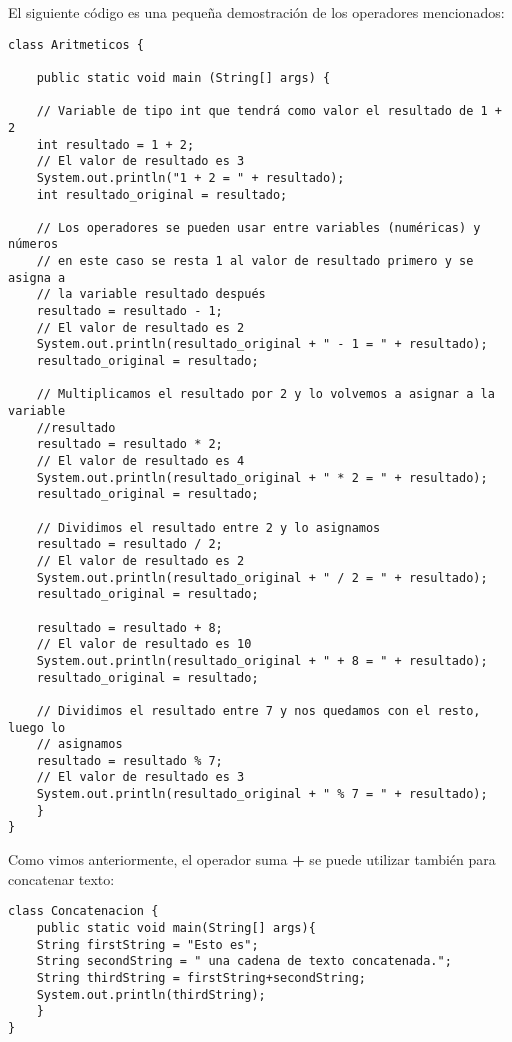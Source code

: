 \documentclass[11pt]{article}
\begin{document}
El siguiente código es una pequeña demostración de los operadores mencionados:
\begin{verbatim}
class Aritmeticos {

    public static void main (String[] args) {

	// Variable de tipo int que tendrá como valor el resultado de 1 + 2
	int resultado = 1 + 2;
	// El valor de resultado es 3
	System.out.println("1 + 2 = " + resultado);
	int resultado_original = resultado;

	// Los operadores se pueden usar entre variables (numéricas) y números
	// en este caso se resta 1 al valor de resultado primero y se asigna a
	// la variable resultado después
	resultado = resultado - 1;
	// El valor de resultado es 2
	System.out.println(resultado_original + " - 1 = " + resultado);
	resultado_original = resultado;

	// Multiplicamos el resultado por 2 y lo volvemos a asignar a la variable
	//resultado
	resultado = resultado * 2;
	// El valor de resultado es 4
	System.out.println(resultado_original + " * 2 = " + resultado);
	resultado_original = resultado;

	// Dividimos el resultado entre 2 y lo asignamos
	resultado = resultado / 2;
	// El valor de resultado es 2
	System.out.println(resultado_original + " / 2 = " + resultado);
	resultado_original = resultado;

	resultado = resultado + 8;
	// El valor de resultado es 10
	System.out.println(resultado_original + " + 8 = " + resultado);
	resultado_original = resultado;

	// Dividimos el resultado entre 7 y nos quedamos con el resto, luego lo
	// asignamos
	resultado = resultado % 7;
	// El valor de resultado es 3
	System.out.println(resultado_original + " % 7 = " + resultado);
    }
}
\end{verbatim}

Como vimos anteriormente, el operador suma \textbf{+} se puede utilizar también para concatenar texto:

\begin{verbatim}
class Concatenacion {
    public static void main(String[] args){
	String firstString = "Esto es";
	String secondString = " una cadena de texto concatenada.";
	String thirdString = firstString+secondString;
	System.out.println(thirdString);
    }
}
\end{verbatim}
\end{document}
